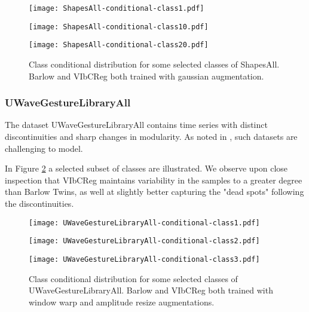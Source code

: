 \documentclass[../../thesis.tex]{subfiles}
\begin{document}
\begin{figure}[H]
    \centering
    \begin{minipage}[b]{0.32\textwidth}
        \centering
        \texttt{[image: ShapesAll-conditional-class1.pdf]}
    \end{minipage}
    \begin{minipage}[b]{0.32\textwidth}
        \centering
        \texttt{[image: ShapesAll-conditional-class10.pdf]}
    \end{minipage}
    \begin{minipage}[b]{0.32\textwidth}
        \centering
        \texttt{[image: ShapesAll-conditional-class20.pdf]}
    \end{minipage}
    \caption{Class conditional distribution for some selected classes of ShapesAll. Barlow and VIbCReg both trained with gaussian augmentation.}
    \label{fig:Gauss_ShapesAll}
\end{figure}

\subsubsection{UWaveGestureLibraryAll}
The dataset UWaveGestureLibraryAll contains time series with distinct discontinuities and sharp changes in modularity. As noted in \cite{TimeVQVAE}, such datasets are challenging to model.\newline

In Figure \ref{fig:Warp_Uwave} a selected subset of classes are illustrated. We observe upon close inspection that VIbCReg maintains variability in the samples to a greater degree than Barlow Twins, as well at slightly better capturing the "dead spots" following the discontinuities. \newline 


\begin{figure}[H]
    \centering
    \begin{minipage}[b]{0.32\textwidth}
        \centering
        \texttt{[image: UWaveGestureLibraryAll-conditional-class1.pdf]}
    \end{minipage}
    \begin{minipage}[b]{0.32\textwidth}
        \centering
        \texttt{[image: UWaveGestureLibraryAll-conditional-class2.pdf]}
    \end{minipage}
    \begin{minipage}[b]{0.32\textwidth}
        \centering
        \texttt{[image: UWaveGestureLibraryAll-conditional-class3.pdf]}
    \end{minipage}
    \caption{Class conditional distribution for some selected classes of UWaveGestureLibraryAll. Barlow and VIbCReg both trained with window warp and amplitude resize augmentations.}
    \label{fig:Warp_Uwave}
\end{figure}
\end{document}
